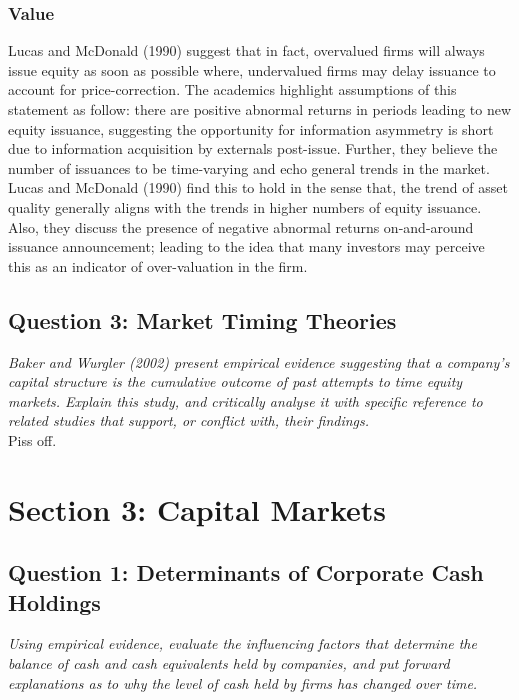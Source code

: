 \documentclass[11pt, english]{article}
\begin{document}
		\subsubsection*{Value}

	Lucas and McDonald (1990) suggest that in fact, overvalued firms will always issue equity as soon as possible where, undervalued firms may delay issuance to account for price-correction. The academics highlight assumptions of this statement as follow: there are positive abnormal returns in periods leading to new equity issuance, suggesting the opportunity for information asymmetry is short due to information acquisition by externals post-issue. Further, they believe the number of issuances to be time-varying and echo general trends in the market. Lucas and McDonald (1990) find this to hold in the sense that, the trend of asset quality generally aligns with the trends in higher numbers of equity issuance. Also, they discuss the presence of negative abnormal returns on-and-around issuance announcement; leading to the idea that many investors may perceive this as an indicator of over-valuation in the firm.

	\newpage

	\subsection{Question 3: Market Timing Theories}

	\textit{Baker and Wurgler (2002) present empirical evidence suggesting that a company’s capital structure is the cumulative outcome of past attempts to time equity markets. Explain this study, and critically analyse it with specific reference to related studies that support, or conflict with, their findings.}\\

	Piss off.

\newpage

\section{Section 3: Capital Markets}

	\subsection{Question 1: Determinants of Corporate Cash Holdings}

	\textit{Using empirical evidence, evaluate the influencing factors that determine the balance of cash and cash equivalents held by companies, and put forward explanations as to why the level of cash held by firms has changed over time.}
\end{document}
